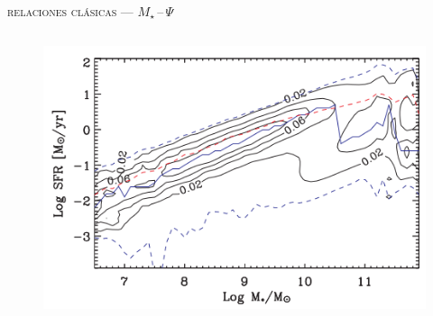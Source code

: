 \documentclass[xcolor=dvipsnames,4pt,hyperref={colorlinks,citecolor=black,linkcolor=black,urlcolor=black}]{beamer}
\begin{document}
\begin{frame}{\textsc{relaciones clásicas --- $M_\star\,$--$\,\Psi$}}

\begin{columns}
\begin{figure}
\includegraphics[scale=0.9]{img/brinchmann2004-17}
\end{figure}
\end{columns}
\end{frame}
\end{document}
